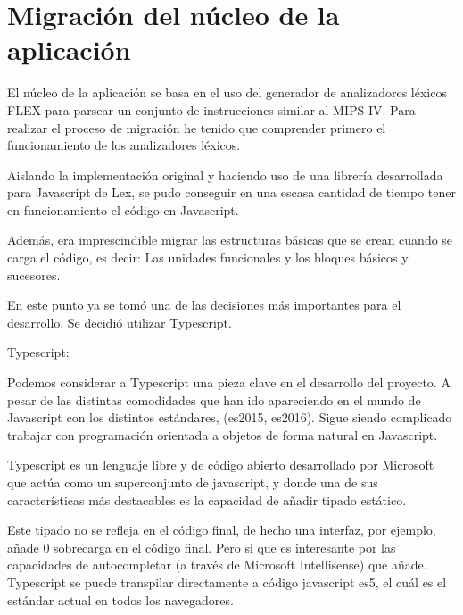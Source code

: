 

\section{Migración del núcleo de la aplicación}
\label{5:sec1} 

El núcleo de la aplicación se basa en el uso del generador de analizadores léxicos FLEX para parsear
un conjunto de instrucciones similar al MIPS IV. Para realizar el proceso de migración he tenido que comprender primero el funcionamiento de los analizadores léxicos.

Aislando la implementación original y haciendo uso de una librería desarrollada para Javascript de Lex,
se pudo conseguir en una escasa cantidad de tiempo tener en funcionamiento el código en Javascript.

Además, era imprescindible migrar las estructuras básicas que se crean cuando se carga el código, 
es decir: Las unidades funcionales y los bloques básicos y sucesores.

En este punto ya se tomó una de las decisiones más importantes para el desarrollo. 
Se decidió utilizar Typescript.

Typescript:

Podemos considerar a Typescript una pieza clave en el desarrollo del proyecto. A pesar de las distintas comodidades que han ido apareciendo en el mundo de Javascript con los distintos estándares,  (es2015, es2016). Sigue siendo complicado trabajar con programación orientada a objetos de forma natural en Javascript.  

Typescript es un lenguaje libre y de código abierto desarrollado por Microsoft que actúa como un superconjunto de javascript, y donde una de sus características más destacables es la capacidad de añadir tipado estático.

Este tipado no se refleja en el código final, de hecho una interfaz, por ejemplo, añade 0 sobrecarga en el código final. Pero si que es interesante por las capacidades de  autocompletar (a través de Microsoft Intellisense)  que añade. Typescript se puede transpilar directamente a código javascript es5, el cuál es el estándar actual en todos los navegadores.    


